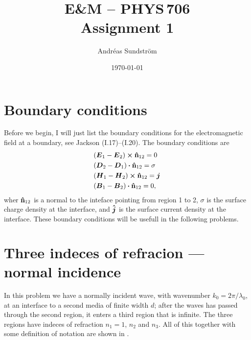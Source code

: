 \documentclass[11pt,letter, swedish, english
]{article}
\begin{document}




\title{E\&M -- PHYS\,706 \\
Assignment 1}
\author{Andréas Sundström}
\date{\today}

\maketitle


\section*{Boundary conditions}
Before we begin, I will just list the boundary conditions for the
electromagnetic field at a boundary, see Jackson (I.17)--(I.20). The
boundary conditions are
\begin{align}
&(\vb*E_1 - \vb*E_2)\cross\vu{n}_{12} = 0     \label{eq:01}\\
&(\vb*D_2 - \vb*D_1)\vdot\vu{n}_{12} = \sigma \label{eq:02}\\
&(\vb*H_1 - \vb*H_2)\cross\vu{n}_{12} = \vb*j \label{eq:03}\\
&(\vb*B_1 - \vb*B_2)\vdot\vu{n}_{12} = 0,     \label{eq:04}
\end{align}
wher $\vu{n}_{12}$ is a normal to the inteface pointing from region 1
to 2, $\sigma$ is the surface charge density at the interface, and
$\vu*j$ is the surface current density at the interface. These
boundary conditions will be usefull in the following problems. 

\section{Three indeces of refracion --- normal incidence}
\newcommand{\Ep}{{\mathcal{E}_1^+}}
\newcommand{\Epp}{{\mathcal{E}_2^+}}
\newcommand{\Eppp}{{\mathcal{E}_3^+}}
\newcommand{\Em}{{\mathcal{E}_1^-}}
\newcommand{\Emm}{{\mathcal{E}_2^-}}

In this problem we have a normally incident wave, with wavenumber
$k_0=2\pi/\lambda_0$, at an interface to a second media of finite
width $d$; after the waves has passed through the second region, it
enters a third region that is infinite. The three regions have indeces
of refraction $n_1=1$, $n_2$ and $n_3$. All of this together with some 
definition of notation are shown in .
\end{document}
